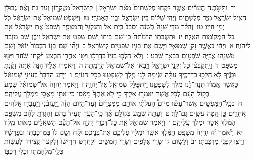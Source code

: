 \documentclass[18pt]{article}
\begin{document}
 {\loc יד~}וַתָּשֹׁ֣בְנָה הֶעָרִ֡ים אֲשֶׁ֣ר לָֽקְחוּ־פְלִשְׁתִּים֩ מֵאֵ֨ת יִשְׂרָאֵ֤ל  |  לְיִשְׂרָאֵל֙ מֵעֶקְר֣וֹן וְעַד־גַּ֔ת וְאֶ֨ת־גְּבוּלָ֔ן הִצִּ֥יל יִשְׂרָאֵ֖ל מִיַּ֣ד פְּלִשְׁתִּ֑ים וַיְהִ֣י שָׁל֔וֹם בֵּ֥ין יִשְׂרָאֵ֖ל וּבֵ֥ין הָאֱמֹרִֽי׃ \startlock
 {\loc טו~}וַיִּשְׁפֹּ֤ט שְׁמוּאֵל֙ אֶת־יִשְׂרָאֵ֔ל כֹּ֖ל יְמֵ֥י חַיָּֽיו׃ \startlock
 {\loc טז~}וְהָלַ֗ךְ מִדֵּ֤י שָׁנָה֙ בְּשָׁנָ֔ה וְסָבַב֙ בֵּֽית־אֵ֔ל וְהַגִּלְגָּ֖ל וְהַמִּצְפָּ֑ה וְשָׁפַט֙ אֶת־יִשְׂרָאֵ֔ל אֵ֥ת כׇּל־הַמְּקוֹמ֖וֹת הָאֵֽלֶּה׃ \startlock
 {\loc יז~}וּתְשֻׁבָת֤וֹ הָרָמָ֙תָה֙ כִּֽי־שָׁ֣ם בֵּית֔וֹ וְשָׁ֖ם שָׁפָ֣ט אֶת־יִשְׂרָאֵ֑ל וַיִּבֶן־שָׁ֥ם מִזְבֵּ֖חַ לַיהֹוָֽה׃ 
\startlock
 {\loc א~}וַיְהִ֕י כַּאֲשֶׁ֥ר זָקֵ֖ן שְׁמוּאֵ֑ל וַיָּ֧שֶׂם אֶת־בָּנָ֛יו שֹׁפְטִ֖ים לְיִשְׂרָאֵֽל׃ \startlock
 {\loc ב~}וַיְהִ֞י שֶׁם־בְּנ֤וֹ הַבְּכוֹר֙ יוֹאֵ֔ל וְשֵׁ֥ם מִשְׁנֵ֖הוּ אֲבִיָּ֑ה שֹׁפְטִ֖ים בִּבְאֵ֥ר שָֽׁבַע׃ \startlock
 {\loc ג~}וְלֹֽא־הָלְכ֤וּ בָנָיו֙ בִּדְרָכָ֔ו וַיִּטּ֖וּ אַחֲרֵ֣י הַבָּ֑צַע וַיִּ֨קְחוּ־שֹׁ֔חַד וַיַּטּ֖וּ מִשְׁפָּֽט׃ \startlock
 {\loc ד~}וַיִּֽתְקַבְּצ֔וּ כֹּ֖ל זִקְנֵ֣י יִשְׂרָאֵ֑ל וַיָּבֹ֥אוּ אֶל־שְׁמוּאֵ֖ל הָרָמָֽתָה׃ \startlock
 {\loc ה~}וַיֹּאמְר֣וּ אֵלָ֗יו הִנֵּה֙ אַתָּ֣ה זָקַ֔נְתָּ וּבָנֶ֕יךָ לֹ֥א הָלְכ֖וּ בִּדְרָכֶ֑יךָ עַתָּ֗ה שִֽׂימָה־לָּ֥נוּ מֶ֛לֶךְ לְשׇׁפְטֵ֖נוּ כְּכׇל־הַגּוֹיִֽם׃ \startlock
 {\loc ו~}וַיֵּ֤רַע הַדָּבָר֙ בְּעֵינֵ֣י שְׁמוּאֵ֔ל כַּאֲשֶׁ֣ר אָֽמְר֔וּ תְּנָה־לָּ֥נוּ מֶ֖לֶךְ לְשׇׁפְטֵ֑נוּ וַיִּתְפַּלֵּ֥ל שְׁמוּאֵ֖ל אֶל־יְהֹוָֽה׃ \startlock
 {\loc ז~}וַיֹּ֤אמֶר יְהֹוָה֙ אֶל־שְׁמוּאֵ֔ל שְׁמַע֙ בְּק֣וֹל הָעָ֔ם לְכֹ֥ל אֲשֶׁר־יֹאמְר֖וּ אֵלֶ֑יךָ כִּ֣י לֹ֤א אֹֽתְךָ֙ מָאָ֔סוּ כִּי־אֹתִ֥י מָאֲס֖וּ מִמְּלֹ֥ךְ עֲלֵיהֶֽם׃ \startlock
 {\loc ח~}כְּכׇֽל־הַמַּעֲשִׂ֣ים אֲשֶׁר־עָשׂ֗וּ מִיּוֹם֩ הַעֲלֹתִ֨י אוֹתָ֤ם מִמִּצְרַ֙יִם֙ וְעַד־הַיּ֣וֹם הַזֶּ֔ה וַיַּ֣עַזְבֻ֔נִי וַיַּעַבְד֖וּ אֱלֹהִ֣ים אֲחֵרִ֑ים כֵּ֛ן הֵ֥מָּה עֹשִׂ֖ים גַּם־לָֽךְ׃ \startlock
 {\loc ט~}וְעַתָּ֖ה שְׁמַ֣ע בְּקוֹלָ֑ם אַ֗ךְ כִּֽי־הָעֵ֤ד תָּעִיד֙ בָּהֶ֔ם וְהִגַּדְתָּ֣ לָהֶ֔ם מִשְׁפַּ֣ט הַמֶּ֔לֶךְ אֲשֶׁ֥ר יִמְלֹ֖ךְ עֲלֵיהֶֽם׃ \startlock
 {\loc י~}וַיֹּ֣אמֶר שְׁמוּאֵ֔ל אֵ֖ת כׇּל־דִּבְרֵ֣י יְהֹוָ֑ה אֶל־הָעָ֕ם הַשֹּׁאֲלִ֥ים מֵאִתּ֖וֹ מֶֽלֶךְ׃ \startlock
 {\loc יא~}וַיֹּ֕אמֶר זֶ֗ה יִֽהְיֶה֙ מִשְׁפַּ֣ט הַמֶּ֔לֶךְ אֲשֶׁ֥ר יִמְלֹ֖ךְ עֲלֵיכֶ֑ם אֶת־בְּנֵיכֶ֣ם יִקָּ֗ח וְשָׂ֥ם לוֹ֙ בְּמֶרְכַּבְתּ֣וֹ וּבְפָרָשָׁ֔יו וְרָצ֖וּ לִפְנֵ֥י מֶרְכַּבְתּֽוֹ׃ \startlock
 {\loc יב~}וְלָשׂ֣וּם ל֔וֹ שָׂרֵ֥י אֲלָפִ֖ים וְשָׂרֵ֣י חֲמִשִּׁ֑ים וְלַחֲרֹ֤שׁ חֲרִישׁוֹ֙ וְלִקְצֹ֣ר קְצִיר֔וֹ וְלַעֲשׂ֥וֹת כְּלֵֽי־מִלְחַמְתּ֖וֹ וּכְלֵ֥י רִכְבּֽוֹ׃ \startlock
\end{document}
